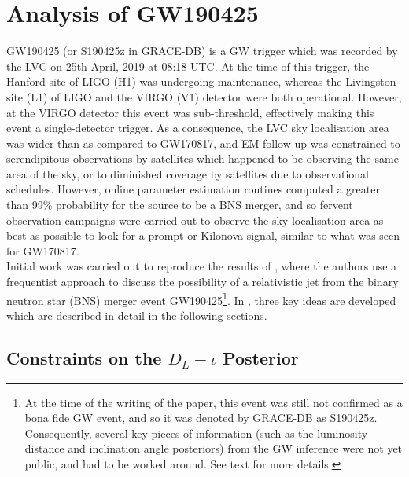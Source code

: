 \section{Analysis of GW190425}\label{sec:190425}

    GW190425 (or S190425z in GRACE-DB) is a GW trigger which was recorded by the LVC on
    25th April, 2019 at 08:18 UTC. At the time of this trigger, the Hanford site of LIGO
    (H1) was undergoing maintenance, whereas the Livingston site (L1) of LIGO and the
    VIRGO (V1) detector were both operational. However, at the VIRGO detector this event
    was sub-threshold, effectively making this event a single-detector trigger. As a
    consequence, the LVC sky localisation area was wider than as compared to GW170817,
    and EM follow-up was constrained to serendipitous observations by satellites which
    happened to be observing the same area of the sky, or to diminished coverage by
    satellites due to observational schedules. However, online parameter estimation
    routines computed a greater than 99\% probability for the source to be a BNS merger,
    and so fervent observation campaigns were carried out to observe the sky
    localisation area as best as possible to look for a prompt or Kilonova signal,
    similar to what was seen for GW170817.\\
    Initial work was carried out to reproduce the results of \cite{saleem_2020B}, where
    the authors use a frequentist approach to discuss the possibility of a relativistic
    jet from the binary neutron star (BNS) merger event GW190425\footnote
    {
        At the time of the writing of the paper, this event was still not confirmed as a
        bona fide GW event, and so it was denoted by GRACE-DB as S190425z. Consequently,
        several key pieces of information (such as the luminosity distance and
        inclination angle posteriors) from the GW inference were not yet public, and had
        to be worked around. See text for more details.
    }. In \cite{saleem_2020B}, three key ideas are developed which are described in
    detail in the following sections.

    \subsection{Constraints on the \texorpdfstring{$D_L-\iota$}{dL-iota} Posterior}
    \label{sec:dl-iota_posterior}

